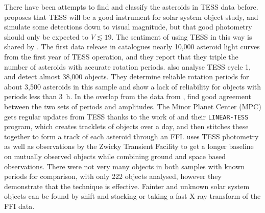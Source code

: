\documentclass{UCreport}
\begin{document}
There have been attempts to find and classify the asteroids in TESS data before.
\citet{Pal2018} proposes that TESS will be a good instrument for solar system object study, and simulate some detections down to  visual magnitude, but that good photometry should only be expected to $V \lesssim 19$.
The sentiment of using TESS in this way is shared by \citet{Wong2019}.
The first data release in \citet{Pal2020} catalogues nearly 10,000 asteroid light curves from the first year of TESS operation, and they report that they triple the number of asteroids with accurate rotation periods.
\citet{McNeill2023} also analyse TESS cycle 1, and detect almost 38,000 objects.
They determine reliable rotation periods for about 3,500 asteroids in this sample and show a lack of reliability for objects with periods less than \qty{3}{\hour}.
In the overlap from the data from \citet{Pal2020}, \citeauthor{McNeill2023} find good agreement between the two sets of periods and amplitudes.
The Minor Planet Center (MPC) gets regular updates from TESS thanks to the work of \citet{Woods2021} and their \texttt{LINEAR-TESS} program, which creates tracklets of objects over a day, and then stitches these together to form a track of each asteroid through an FFI.
\citet{Gowanlock2024} uses TESS photometry as well as  observations by the Zwicky Transient Facility \citep[ZTF, ][]{Bellm2018} to get a longer baseline on mutually observed objects while combining ground and space based observations.
There were not very many objects in both samples with known periods for comparison, with only 222 objects analysed, however they demonstrate that the technique is effective.
Fainter and unknown solar system objects can be found by shift and stacking \citep{Holman2019, Payne2019,Rice2020} or taking a fast X-ray transform \citep{Nguyen2024} of the FFI data.
\end{document}
